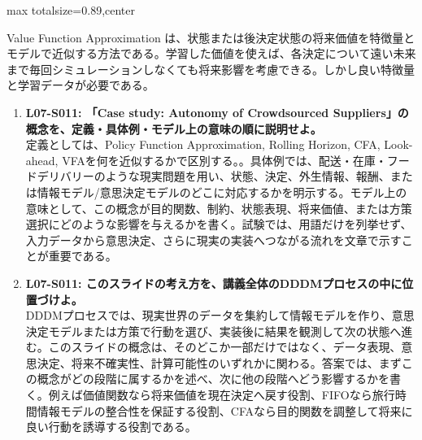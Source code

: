 \begin{minipage}[t]{0.58\textwidth}
\begin{adjustbox}{max totalsize={\textwidth}{0.89\textheight},center}
\begin{minipage}{\textwidth}
Value Function Approximation は、状態または後決定状態の将来価値を特徴量とモデルで近似する方法である。学習した価値を使えば、各決定について遠い未来まで毎回シミュレーションしなくても将来影響を考慮できる。しかし良い特徴量と学習データが必要である。\par{}\begin{enumerate}\item \textbf{L07-S011: 「Case study: Autonomy of Crowdsourced Suppliers」の概念を、定義・具体例・モデル上の意味の順に説明せよ。}\\定義としては、Policy Function Approximation, Rolling Horizon, CFA, Look-ahead, VFAを何を近似するかで区別する。。具体例では、配送・在庫・フードデリバリーのような現実問題を用い、状態、決定、外生情報、報酬、または情報モデル/意思決定モデルのどこに対応するかを明示する。モデル上の意味として、この概念が目的関数、制約、状態表現、将来価値、または方策選択にどのような影響を与えるかを書く。試験では、用語だけを列挙せず、入力データから意思決定、さらに現実の実装へつながる流れを文章で示すことが重要である。\item \textbf{L07-S011: このスライドの考え方を、講義全体のDDDMプロセスの中に位置づけよ。}\\DDDMプロセスでは、現実世界のデータを集約して情報モデルを作り、意思決定モデルまたは方策で行動を選び、実装後に結果を観測して次の状態へ進む。このスライドの概念は、そのどこか一部だけではなく、データ表現、意思決定、将来不確実性、計算可能性のいずれかに関わる。答案では、まずこの概念がどの段階に属するかを述べ、次に他の段階へどう影響するかを書く。例えば価値関数なら将来価値を現在決定へ戻す役割、FIFOなら旅行時間情報モデルの整合性を保証する役割、CFAなら目的関数を調整して将来に良い行動を誘導する役割である。\end{enumerate}
\end{minipage}
\end{adjustbox}
\end{minipage}


